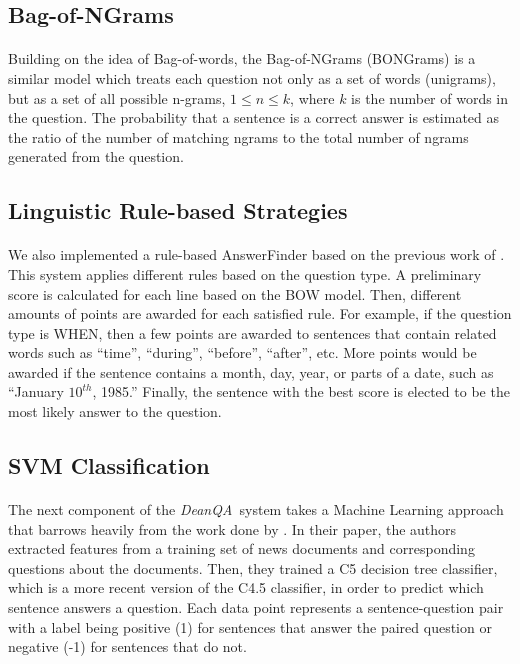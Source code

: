 \documentclass[11pt,letterpaper]{article}
\newcommand{\name}{\emph{DeanQA~}}
\begin{document}
\subsection{Bag-of-NGrams}
\paragraph{}
Building on the idea of Bag-of-words, the Bag-of-NGrams (BONGrams) is a similar model which treats each question not only as a set of words (unigrams), but as a set of all possible n-grams, $1 \leq n \leq k$, where $k$ is the number of words in the question. The probability that a sentence is a correct answer is estimated as the ratio of the number of matching ngrams to the total number of ngrams generated from the question.

\subsection{Linguistic Rule-based Strategies}
\paragraph{}
We also implemented a rule-based AnswerFinder based on the previous
work of \cite{riloff2000}. This system applies different rules based
on the question type. A preliminary score is calculated for each line
based on the BOW model. Then, different amounts of points are awarded
for each satisfied rule. For example, if the question type is WHEN,
then a few points are awarded to sentences that contain related words
such as ``time'', ``during'', ``before'', ``after'', etc. More points
would be awarded if the sentence contains a month, day, year, or parts
of a date, such as ``January $10^{th}$, 1985.'' Finally, the sentence
with the best score is elected to be the most likely answer to the
question.


\subsection{SVM Classification}
\paragraph{}
The next component of the \name system takes a Machine Learning
approach that barrows heavily from the work done by
\cite{Ng00amachine}.  In their paper, the authors extracted features
from a training set of news documents and corresponding questions
about the documents.  Then, they trained a C5 decision tree
classifier, which is a more recent version of the C4.5
\cite{Quinlan:1993:CPM:152181} classifier, in order to predict which
sentence answers a question.  Each data point represents a
sentence-question pair with a label being positive (1) for sentences
that answer the paired question or negative (-1) for sentences that do
not.
\end{document}
